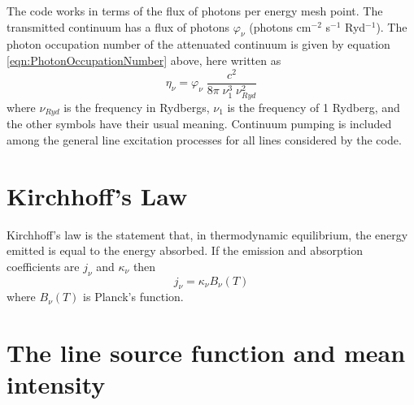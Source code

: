 The code works in terms of the flux of photons per energy mesh point.
The transmitted continuum has a flux of photons $\varphi_\nu$
(photons cm$^{-2}$ s$^{-1}$ Ryd$^{-1}$).
The photon occupation number of the attenuated continuum is given by equation \ref{eqn:PhotonOccupationNumber} above, here written as
\begin{equation}
{\eta _\nu } = {\varphi _\nu }\;\frac{{{c^2}}}{{8\pi \;\nu _1^3\;\nu
_{Ryd}^2}}
\end{equation}
where $\nu_{Ryd}$ is the frequency in Rydbergs,
$\nu_1$ is the frequency of 1 Rydberg,
and the other symbols have their usual meaning.
Continuum pumping is
included among the general line excitation processes for all lines
considered by the code.

\section{Kirchhoff's Law}

Kirchhoff's law is the statement that, in thermodynamic equilibrium,
the energy emitted is equal to the energy absorbed.  If the emission and
absorption coefficients are $j_{\nu}$ and $\kappa_{\nu}$ then
\begin{equation}
j_{\nu} = \kappa_{\nu} B_{\nu}(T)
\end{equation}
where $B_{\nu}(T)$ is Planck's function.

\section{The line source function and mean intensity}

